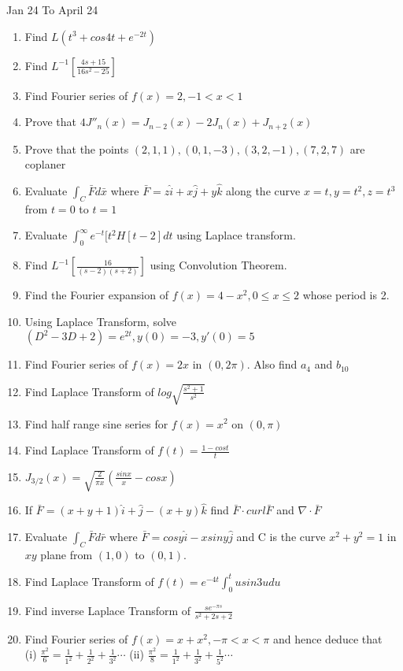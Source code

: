 \documentclass[17pt]{extarticle}
\begin{document}
Jan 24 To April 24

\begin{enumerate}
    \item Find $ L(t^3 + cos 4t + e^{-2t} ) $
    \item Find $ L^{-1} \left[ \frac{4s+15}{16s^2-25} \right] $
    \item Find Fourier series of $ f(x) = 2, -1<x<1 $
    \item Prove that $ 4J''_n(x) =  J_{n-2}(x) - 2J_n(x) + J_{n+2}(x)  $
    \item Prove that the points $(2,1,1), (0,1,-3), (3,2,-1), (7,2,7)  $
    are coplaner
    \item Evaluate $\int_C \bar{F}d\bar{x}$ where $\bar{F}=z\hat{i}+x\hat{j}+y\hat{k}$ along the curve $x=t, y=t^2, z=t^3$ from $t=0$ to $t=1$
    \item Evaluate $ \int_0^{\infty} e^{-t}[t^2H[t-2]dt$ using Laplace transform.
    \item Find $ L^{-1} \left[ \frac{16}{(s-2)(s+2)} \right] $ using Convolution Theorem.
    \item Find the Fourier expansion of $ f(x) = 4-x^2, 0 \leq x \leq 2 $ whose period is 2.
    \item Using Laplace Transform, solve $(D^2 - 3D + 2)= e^{2t},y(0)=-3,y'(0)=5 $
    \item  Find Fourier series of $ f(x) = 2x$ in $ (0,2\pi). $ Also find $a_4$ and $b_{10}$ 
    \item Find Laplace Transform of $log \sqrt{\frac{s^2+1}{s^2}}$
    \item Find half range sine series for $f(x) = x^2$ on $(0,\pi) $
    \item Find Laplace Transform of $ f(t) = \frac{1 - cos t}{t}$
    \item $ J_{3/2}(x) = \sqrt{\frac{2}{\pi x}} \left( \frac{sin x}{x} - cos x\right) $
    \item If $\bar{F} =(x+y+1)\hat{i}+\hat{j}-(x+y)\hat{k} $ find $\bar{F} \cdot curl \bar{F}$ and $ \nabla \cdot \bar{F}$
    \item Evaluate $ \int_C \bar{F}d\bar{r} $ where $ \bar{F} = cosy \hat{i} - xsiny \hat{j} $ and C is the curve $ x^2 + y^2 = 1 $ in $xy$ plane from $(1,0)$  to $(0,1)$.
    \item Find Laplace Transform of $f(t) =  e^{-4t} \int_0^t usin3udu $
    
    \item Find inverse Laplace Transform of $ \frac{se^{-\pi s}}{s^2+2s+2}$
    \item Find Fourier series of $ f(x) = x + x^2, -\pi<x<\pi $ and hence deduce that \\ 
    (i) $ \frac{\pi^2}{6}=\frac{1}{1^2}+\frac{1}{2^2}+\frac{1}{3^2}  \cdots $ (ii) $ \frac{\pi^2}{8}=\frac{1}{1^2}+\frac{1}{3^2}+\frac{1}{5^2}  \cdots $
    
    
\end{enumerate}
\end{document}
